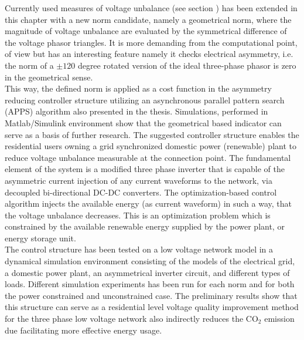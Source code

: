     Currently used measures of voltage unbalance (see section ) has been extended in this chapter with a new norm candidate, namely a geometrical norm, where the magnitude of voltage unbalance are evaluated by the symmetrical difference of the voltage phasor triangles. It is more demanding from the computational point, of view but has an interesting feature namely it checks electrical asymmetry, i.e. the norm of a $\pm120$ degree  rotated version of the ideal three-phase phasor is zero in the geometrical sense.\\
    This way, the defined norm is applied as a cost function in the asymmetry reducing controller structure utilizing an asynchronous parallel pattern search (APPS) algorithm also presented in the thesis. Simulations, performed in Matlab/Simulink environment show that the geometrical based indicator can serve as a basis of further research. The suggested controller structure enables the residential users owning a grid synchronized domestic power (renewable) plant to reduce voltage unbalance measurable at the connection point. The fundamental element of the system is a modified three phase inverter that is capable of the asymmetric current injection of any current waveforms to the network, via decoupled bi-directional DC-DC converters. The optimization-based control algorithm injects the available energy (as current waveform) in such a way, that the voltage unbalance decreases. This is an optimization problem which is constrained by the available renewable energy supplied by the power plant, or energy storage unit.\\
    The control structure has been tested on a low voltage network model in a dynamical simulation environment consisting of the models of the electrical grid, a domestic power plant, an asymmetrical inverter circuit, and different types of loads. Different simulation experiments has been run for each norm and for both the power constrained and unconstrained case. The preliminary results show that this structure can serve as a residential level voltage quality improvement method for the three phase low voltage network also indirectly reduces the CO${}_2$ emission due facilitating more effective energy usage.


